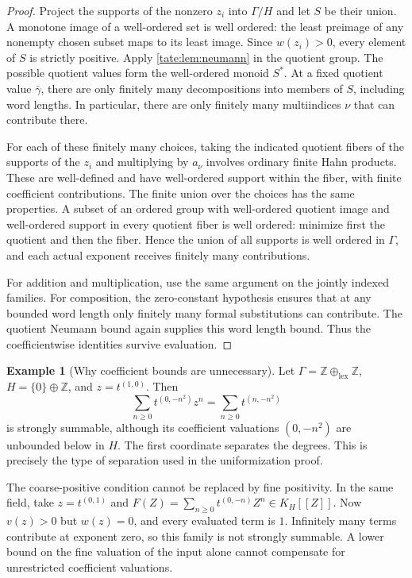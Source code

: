 \documentclass[11pt,letterpaper]{article}
\theoremstyle{definition}
\newtheorem{example}[example]{Example}
\newcommand{\Z}{\mathbb Z}
\begin{document}
\begin{proof}
Project the supports of the nonzero $z_i$ into $\Gamma/H$ and let $S$
be their union. A monotone image of a well-ordered set is well ordered:
the least preimage of any nonempty chosen subset maps to its least
image. Since $w(z_i)>0$, every element of $S$ is strictly positive.
Apply \cref{tate:lem:neumann} in the quotient group. The possible quotient
values form the well-ordered monoid $S^*$. At a fixed quotient value
$\bar\gamma$, there are only finitely many decompositions into members
of $S$, including word lengths. In particular, there are only finitely
many multiindices $\nu$ that can contribute there.

For each of these finitely many choices, taking the indicated quotient
fibers of the supports of the $z_i$ and multiplying by $a_\nu$ involves
ordinary finite Hahn products. These are well-defined and have
well-ordered support within the fiber, with finite coefficient
contributions. The finite union over the choices has the same properties.
A subset of an ordered group with well-ordered quotient image and
well-ordered support in every quotient fiber is well ordered: minimize
first the quotient and then the fiber. Hence the union of all supports
is well ordered in $\Gamma$, and each actual exponent receives finitely
many contributions.

For addition and multiplication, use the same argument on the jointly
indexed families. For composition, the zero-constant hypothesis ensures
that at any bounded word length only finitely many formal substitutions
can contribute. The quotient Neumann bound again supplies this word
length bound. Thus the coefficientwise identities survive evaluation.
\end{proof}

\begin{example}[Why coefficient bounds are unnecessary]\label{tate:ex:unbounded}
Let $\Gamma=\Z\oplus_{\mathrm{lex}}\Z$, $H=\{0\}\oplus\Z$,
and $z=t^{(1,0)}$. Then
\[
 \sum_{n\ge0}t^{(0,-n^2)}z^n
       =\sum_{n\ge0}t^{(n,-n^2)}
\]
is strongly summable, although its coefficient valuations
$(0,-n^2)$ are unbounded below in $H$. The first coordinate separates
the degrees. This is precisely the type of separation used in the
uniformization proof.

The coarse-positive condition cannot be replaced by fine positivity.
In the same field, take $z=t^{(0,1)}$ and
$F(Z)=\sum_{n\ge0}t^{(0,-n)}Z^n\in K_H[[Z]]$.
Now $v(z)>0$ but $w(z)=0$, and every evaluated term is $1$.
Infinitely many terms contribute at exponent zero, so this family is
not strongly summable. A lower bound on the fine valuation of the
input alone cannot compensate for unrestricted coefficient valuations.
\end{example}
\end{document}
